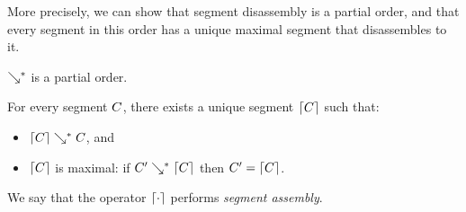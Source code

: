 More precisely, we can show that segment disassembly is a
partial order, and that every segment in this order
has a unique maximal segment that disassembles to it.
\begin{lemma}
  $\searrow^*$ is a partial order.
\end{lemma}
\begin{lemma}\label{lemma:unique-parsed-selection}
  For every segment $C$, there exists a unique
  segment $\left\lceil C\right\rceil$ such that:
  \begin{itemize}
  \item $\left\lceil C\right\rceil\searrow^*C$, and
  \item $\left\lceil C\right\rceil$ is maximal: if $C'\searrow^*\left\lceil C\right\rceil$ then $C' = \left\lceil C\right\rceil$.
  \end{itemize}
\end{lemma}
\noindent
We say that the operator $\left\lceil\cdot\right\rceil$ performs \emph{segment assembly}.

% 

